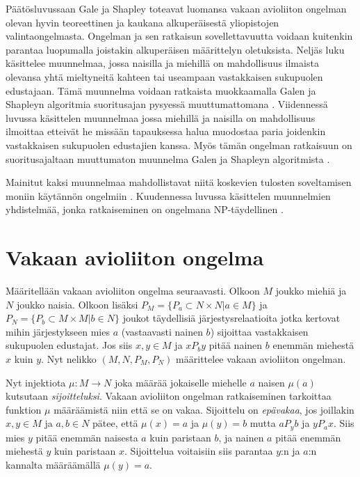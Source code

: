 \documentclass[gradu, twoside]{tktltiki}
\begin{document}
Päätösluvussaan Gale ja Shapley toteavat luomansa vakaan avioliiton
ongelman olevan hyvin teoreettinen ja kaukana alkuperäisestä
yliopistojen valintaongelmasta. Ongelman ja sen ratkaisun
sovellettavuutta voidaan kuitenkin parantaa luopumalla joistakin
alkuperäisen määrittelyn oletuksista. Neljäs luku käsittelee
muunnelmaa, jossa naisilla ja miehillä on mahdollisuus ilmaista
olevansa yhtä mieltyneitä kahteen tai useampaan vastakkaisen
sukupuolen edustajaan. Tämä muunnelma voidaan ratkaista muokkaamalla
Galen ja Shapleyn algoritmia suoritusajan pysyessä muuttumattomana
\cite{manlove02}. Viidennessä luvussa käsittelen muunnelmaa jossa
miehillä ja naisilla on mahdollisuus ilmoittaa etteivät he missään
tapauksessa halua muodostaa paria joidenkin vastakkaisen sukupuolen
edustajien kanssa. Myös tämän ongelman ratkaisuun on suoritusajaltaan
muuttumaton muunnelma Galen ja Shapleyn algoritmista
\cite{gusfield89}.

Mainitut kaksi muunnelmaa mahdollistavat niitä koskevien tulosten
soveltamisen moniin käytännön ongelmiin \cite{manlove02}. Kuudennessa
luvussa käsittelen muunnelmien yhdistelmää, jonka ratkaiseminen on
ongelmana NP-täydellinen \cite{manlove02}.

\section{Vakaan avioliiton ongelma}

Määritellään vakaan avioliiton ongelma seuraavasti. Olkoon $M$ joukko
miehiä ja $N$ joukko naisia. Olkoon lisäksi $P_M = \{P_a \subset N
\times N | a \in M\}$ ja $P_N = \{P_b \subset M \times M | b \in N\}$
joukot täydellisiä järjestysrelaatioita jotka kertovat mihin
järjestykseen mies $a$ (vastaavasti nainen $b$) sijoittaa vastakkaisen
sukupuolen edustajat. Jos siis $x,y \in M$ ja $xP_by$ pitää nainen $b$
enemmän miehestä $x$ kuin $y$. Nyt nelikko $(M, N, P_M, P_N)$
määrittelee vakaan avioliiton ongelman.

Nyt injektiota $\mu : M \rightarrow N$ joka määrää jokaiselle
miehelle $a$ naisen $\mu(a)$ kutsutaan \emph{sijoitteluksi}.
Vakaan avioliiton ongelman ratkaiseminen tarkoittaa funktion $\mu$
määräämistä niin että se on vakaa. Sijoittelu on \emph{epävakaa}, jos
joillakin $x, y \in M$ ja $a, b \in N$ pätee, että $\mu(x) = a$
ja $\mu(y) = b$ mutta $aP_yb$ ja $yP_ax$. Siis mies $y$ pitää
enemmän naisesta $a$ kuin paristaan $b$, ja nainen $a$ pitää
enemmän miehestä $y$ kuin paristaan $x$. Sijoittelua voitaisiin
siis parantaa $y$:n ja $a$:n kannalta määräämällä $\mu(y) = a$.
\end{document}
